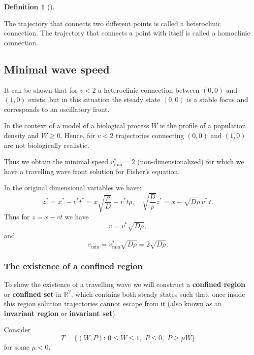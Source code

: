 \documentclass[
  letterpaper,
  DIV=11,
  numbers=noendperiod]{scrreprt}
\theoremstyle{plain}
\theoremstyle{definition}
\newtheorem{definition}{Definition}[chapter]
\theoremstyle{plain}
\theoremstyle{remark}
\begin{document}
\begin{definition}[]\protect\hypertarget{def-line}{}\label{def-line}

The trajectory that connects two different points is called a
heteroclinic connection. The trajectory that connects a point with
itself is called a homoclinic connection.

\end{definition}

\hypertarget{minimal-wave-speed}{%
\subsection{Minimal wave speed}\label{minimal-wave-speed}}

It can be shown that for \(v<2\) a heteroclinic connection between
\((0,0)\) and \((1,0)\) exists, but in this situation the steady state
\((0,0)\) is a stable focus and corresponds to an oscillatory front.

In the context of a model of a biological process \(W\) is the profile
of a population density and \(W\geq 0\). Hence, for \(v<2\) trajectories
connecting \((0,0)\) and \((1,0)\) are not biologically realistic.

Thus we obtain the minimal speed \(v^\ast_\text{min}=2\)
(non-dimensionalized) for which we have a travelling wave front solution
for Fisher's equation.

In the original dimensional variables we have: \[
z^\ast= x^\ast - v^\ast t^\ast = x \sqrt{ \frac \rho D} - v^\ast t \rho , \quad 
\sqrt{ \frac D \rho } z^\ast= x  - \sqrt{D \rho}  \, v^\ast\,  t.
\] Thus for \(z = x - vt\) we have \[ 
v=  v^\ast \sqrt{D \rho},
\] and \[
v_{\text{min}}=  v^\ast_{\text{min}} \sqrt{D \rho} = 2  \sqrt{D \rho}.
\]

\hypertarget{the-existence-of-a-confined-region}{%
\subsubsection{The existence of a confined
region}\label{the-existence-of-a-confined-region}}

To show the existence of a travelling wave we will construct a
\textbf{confined region} or \textbf{confined set} in \(\mathbb{R}^2\),
which contains both steady states such that, once inside this region
solution trajectories cannot escape from it (also known as an
\textbf{invariant region} or \textbf{invariant set}).

Consider \[
T= \{ (W,P) : \, 0 \leq W \leq 1,\, \, P \leq 0, \, \,  P \geq \mu W \} 
\] for some \(\mu <0\).
\end{document}
